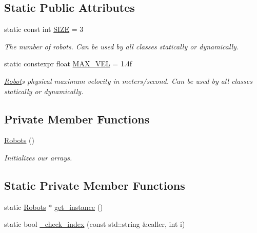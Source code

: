 \subsection*{Static Public Attributes}
\begin{DoxyCompactItemize}
\item 
static const int \hyperlink{class_robots_ae9df2f1d345ad6740f0459956cdd4712}{S\+I\+ZE} = 3
\begin{DoxyCompactList}\small\item\em The number of robots. Can be used by all classes statically or dynamically. \end{DoxyCompactList}\item 
static constexpr float \hyperlink{class_robots_aef695d1329ee9902311720afdfa095a1}{M\+A\+X\+\_\+\+V\+EL} = 1.\+4f
\begin{DoxyCompactList}\small\item\em \hyperlink{struct_robots_1_1_robot}{Robot}\textquotesingle{}s physical maximum velocity in meters/second. Can be used by all classes statically or dynamically. \end{DoxyCompactList}\end{DoxyCompactItemize}
\subsection*{Private Member Functions}
\begin{DoxyCompactItemize}
\item 
\hyperlink{class_robots_aa2745a48ebd3e52b9a3020f6afbcb25d}{Robots} ()
\begin{DoxyCompactList}\small\item\em Initializes our arrays. \end{DoxyCompactList}\end{DoxyCompactItemize}
\subsection*{Static Private Member Functions}
\begin{DoxyCompactItemize}
\item 
static \hyperlink{class_robots}{Robots} $\ast$ \hyperlink{class_robots_a589bce74db5f34af384952d48435168f}{get\+\_\+instance} ()
\item 
static bool \hyperlink{class_robots_a30a0a683eeeb90974bc1e1927f97c178}{\+\_\+check\+\_\+index} (const std\+::string \&caller, int i)
\end{DoxyCompactItemize}
